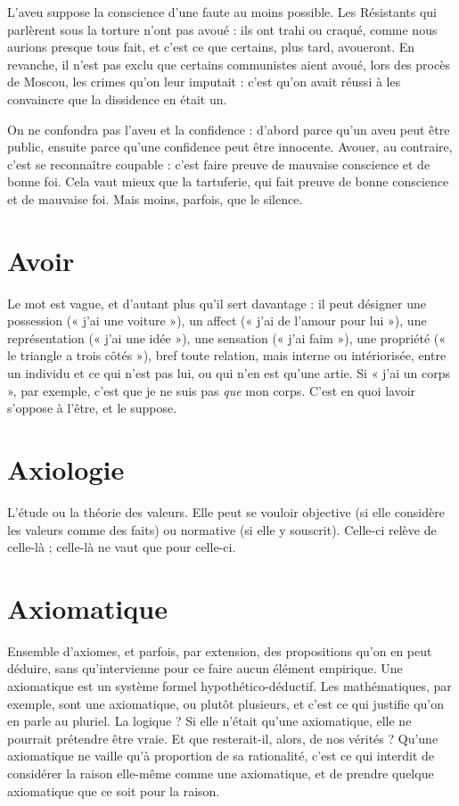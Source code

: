 L’aveu suppose la conscience d’une faute au moins possible. Les Résistants
qui parlèrent sous la torture n’ont pas avoué : ils ont trahi ou craqué, comme
nous aurions presque tous fait, et c’est ce que certains, plus tard, avoueront. En
revanche, il n’est pas exclu que certains communistes aient avoué, lors des
procès de Moscou, les crimes qu’on leur imputait : c’est qu’on avait réussi à les
convaincre que la dissidence en était un.

On ne confondra pas l’aveu et la confidence : d’abord parce qu’un aveu
peut être public, ensuite parce qu’une confidence peut être innocente. Avouer,
au contraire, c’est se reconnaître coupable : c’est faire preuve de mauvaise conscience
et de bonne foi. Cela vaut mieux que la tartuferie, qui fait preuve de
bonne conscience et de mauvaise foi. Mais moins, parfois, que le silence.

\section{Avoir}
Le mot est vague, et d’autant plus qu’il sert davantage : il peut désigner
une possession (« j’ai une voiture »), un affect (« j’ai de l'amour
pour lui »), une représentation (« j'ai une idée »), une sensation (« j'ai faim »),
une propriété (« le triangle a trois côtés »), bref toute relation, mais interne ou
intériorisée, entre un individu et ce qui n’est pas lui, ou qui n’en est qu’une
artie. Si « j'ai un corps », par exemple, c’est que je ne suis pas {\it que} mon corps.
C’est en quoi lavoir s’oppose à l’être, et le suppose.

\section{Axiologie}
L'étude ou la théorie des valeurs. Elle peut se vouloir objective
(si elle considère les valeurs comme des faits) ou normative (si
elle y souscrit). Celle-ci relève de celle-là ; celle-là ne vaut que pour celle-ci.

\section{Axiomatique}
Ensemble d’axiomes, et parfois, par extension, des propositions
qu’on en peut déduire, sans qu’intervienne pour ce
faire aucun élément empirique. Une axiomatique est un système formel hypothético-déductif.
Les mathématiques, par exemple, sont une axiomatique, ou
plutôt plusieurs, et c’est ce qui justifie qu’on en parle au pluriel. La logique ? Si
elle n’était qu’une axiomatique, elle ne pourrait prétendre être vraie. Et que resterait-il,
alors, de nos vérités ?
Qu’une axiomatique ne vaille qu’à proportion de sa rationalité, c’est ce qui
interdit de considérer la raison elle-même comme une axiomatique, et de
prendre quelque axiomatique que ce soit pour la raison.

